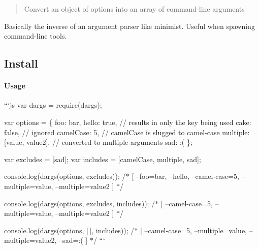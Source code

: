 \begin{quote}
Convert an object of options into an array of command-\/line arguments \end{quote}


Basically the inverse of an argument parser like minimist. Useful when spawning command-\/line tools.

\subsection*{Install}




\paragraph*{Usage}

```js var dargs = require(\textquotesingle{}dargs\textquotesingle{});

var options = \{ foo\+: \textquotesingle{}bar\textquotesingle{}, hello\+: true, // results in only the key being used cake\+: false, // ignored camel\+Case\+: 5, // camel\+Case is slugged to {\ttfamily camel-\/case} multiple\+: \mbox{[}\textquotesingle{}value\textquotesingle{}, \textquotesingle{}value2\textquotesingle{}\mbox{]}, // converted to multiple arguments sad\+: \textquotesingle{}\+:(\textquotesingle{} \};

var excludes = \mbox{[}\textquotesingle{}sad\textquotesingle{}\mbox{]}; var includes = \mbox{[}\textquotesingle{}camel\+Case\textquotesingle{}, \textquotesingle{}multiple\textquotesingle{}, \textquotesingle{}sad\textquotesingle{}\mbox{]};

console.\+log(dargs(options, excludes)); /$\ast$ \mbox{[} \textquotesingle{}--foo=bar\textquotesingle{}, \textquotesingle{}--hello\textquotesingle{}, \textquotesingle{}--camel-\/case=5\textquotesingle{}, \textquotesingle{}--multiple=value\textquotesingle{}, \textquotesingle{}--multiple=value2\textquotesingle{} \mbox{]} $\ast$/

console.\+log(dargs(options, excludes, includes)); /$\ast$ \mbox{[} \textquotesingle{}--camel-\/case=5\textquotesingle{}, \textquotesingle{}--multiple=value\textquotesingle{}, \textquotesingle{}--multiple=value2\textquotesingle{} \mbox{]} $\ast$/

console.\+log(dargs(options, \mbox{[}$\,$\mbox{]}, includes)); /$\ast$ \mbox{[} \textquotesingle{}--camel-\/case=5\textquotesingle{}, \textquotesingle{}--multiple=value\textquotesingle{}, \textquotesingle{}--multiple=value2\textquotesingle{}, \textquotesingle{}--sad=\+:(\textquotesingle{}\textquotesingle{} \mbox{]} $\ast$/ ```

